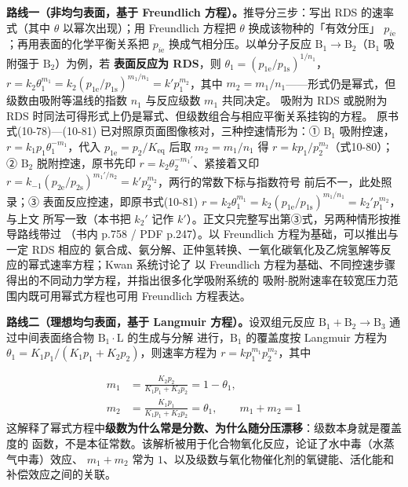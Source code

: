 \textbf{路线一（非均匀表面，基于 Freundlich 方程）。}推导分三步：写出 RDS 的速率式（其中
$\theta$ 以幂次出现）；用 Freundlich 方程把 $\theta$ 换成该物种的「有效分压」
$p_{i\mathrm e}$；再用表面的化学平衡关系把 $p_{i\mathrm e}$ 换成气相分压。以单分子反应
$\mathrm{B_1}\to\mathrm{B_2}$（$\mathrm{B_1}$ 吸附强于 $\mathrm{B_2}$）为例，若
\textbf{表面反应为 RDS}，则 $\theta_1=(p_{1\mathrm e}/p_{1\mathrm s})^{1/n_1}$，
$r=k_2\theta_1^{m_1}=k_2(p_{1\mathrm e}/p_{1\mathrm s})^{m_1/n_1}=k'p_1^{m_2}$，其中
$m_2=m_1/n_1$——形式仍是幂式，但级数由吸附等温线的指数 $n_1$ 与反应级数 $m_1$ 共同决定。
吸附为 RDS 或脱附为 RDS 时同法可得形式上仍是幂式、但级数组合与相应平衡关系挂钩的方程。
原书式(10-78)—(10-81) 已对照原页面图像核对，三种控速情形为：① $\mathrm{B_1}$ 吸附控速，
$r=k_1p_1\theta_1^{-m_1}$，代入 $p_{1\mathrm e}=p_2/K_{\mathrm{eq}}$ 后取
$m_2=m_1/n_1$ 得 $r=kp_1/p_2^{m_2}$（式10-80）；② $\mathrm{B_2}$ 脱附控速，原书先印
$r=k_2\theta_2^{-m_1'}$、紧接着又印
$r=k_{-1}(p_{2\mathrm e}/p_{2\mathrm s})^{m_1'/n_2}=k'p_2^{m_2}$，两行的常数下标与指数符号
前后不一，此处照录；③ 表面反应控速，即原书式(10-81)
$r=k_2\theta_1^{m_1}=k_2(p_{1\mathrm e}/p_{1\mathrm s})^{m_1/n_1}=k_2'p_1^{m_2}$，与上文
所写一致（本书把 $k_2'$ 记作 $k'$）。正文只完整写出第③式，另两种情形按推导路线带过
（书内 p.758 / PDF p.247）。以 Freundlich 方程为基础，可以推出与一定 RDS 相应的
氨合成、氨分解、正仲氢转换、一氧化碳氧化及乙烷氢解等反应的幂式速率方程；Kwan 系统讨论了
以 Freundlich 方程为基础、不同控速步骤得出的不同动力学方程，并指出很多化学吸附系统的
吸附-脱附速率在较宽压力范围内既可用幂式方程也可用 Freundlich 方程表达。

\textbf{路线二（理想均匀表面，基于 Langmuir 方程）。}设双组元反应
$\mathrm{B_1+B_2}\to\mathrm{B_3}$ 通过中间表面络合物 $\mathrm{B_1{\cdot}L}$ 的生成与分解
进行，$\mathrm{B_1}$ 的覆盖度按 Langmuir 方程为
$\theta_1=K_1p_1/(K_1p_1+K_2p_2)$，则速率方程为 $r=kp_1^{m_1}p_2^{m_2}$，其中

\begin{equation}
\begin{split}
m_1&=\frac{K_2p_2}{K_1p_1+K_2p_2}=1-\theta_1,\\
m_2&=\frac{K_1p_1}{K_1p_1+K_2p_2}=\theta_1,
\qquad m_1+m_2=1
\end{split}
\label{eq:golodets}
\end{equation}
这解释了幂式方程中\textbf{级数为什么常是分数、为什么随分压漂移}：级数本身就是覆盖度的
函数，不是本征常数。该解析被用于化合物氧化反应，论证了水中毒（水蒸气中毒）效应、
$m_1+m_2$ 常为 $1$、以及级数与氧化物催化剂的氧键能、活化能和补偿效应之间的关联。

